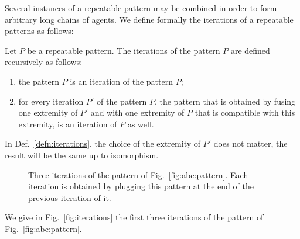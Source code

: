 \documentclass{entcs}
\begin{document}
Several instances of a repeatable pattern may be combined in order to form arbitrary long chains of agents. We define formally the iterations of a repeatable patterns as follows:

\begin{defn}
  \label{defn:iterations}
  Let $P$ be a repeatable pattern.
The iterations of the pattern $P$ are defined recursively as follows:
\begin{enumerate}
  \item the pattern $P$ is an iteration of the pattern $P$;
  \item for every iteration $P'$ of the pattern $P$,
  the pattern that is obtained by fusing one extremity of $P'$ and
  with one extremity of $P$ that is compatible with this extremity,
  is an iteration of $P$ as well.
\end{enumerate}
\end{defn}

In Def.~\ref{defn:iterations}, the choice of the extremity of $P'$ does not matter, the result will be the same up to isomorphism.

\begin{figure}[t]





  \caption{Three iterations of the pattern of Fig.~\ref{fig:abc:pattern}.
  Each iteration is obtained by plugging this pattern at the end of the previous iteration of it.}
\end{figure}
\begin{exmp}
We give in Fig.~\ref{fig:iterations} the first three iterations of the pattern of Fig.~\ref{fig:abc:pattern}.
\end{exmp}
\end{document}
